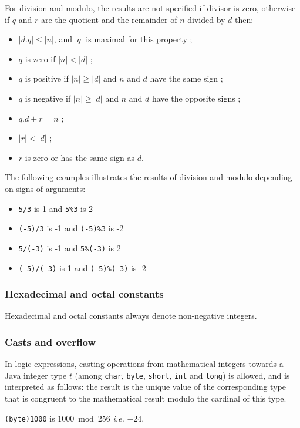 \documentclass[a4paper,11pt,twoside,openright]{report}
\begin{document}
For division and modulo, the results are not specified if divisor is
zero, otherwise if $q$ and $r$ are the quotient and the remainder of
$n$ divided by $d$ then:
\begin{itemize}
\item $|d.q| \leq |n|$, and $|q|$ is maximal for this property ;
\item $q$ is zero if $|n|<|d|$ ;
\item $q$ is positive if $|n|\geq|d|$ and $n$ and $d$ have the same sign ;
\item $q$ is negative if $|n|\geq|d|$ and $n$ and $d$ have the opposite signs ;
\item $q.d+r = n$ ;
\item $|r|<|d|$ ;
\item $r$ is zero or has the same sign as $d$.
\end{itemize}

\begin{example}
  The following examples illustrates the results of division and modulo depending on signs of arguments:
  \begin{itemize}
  \item \verb|5/3| is 1 and \verb|5%3| is 2
  \item \verb|(-5)/3| is -1 and \verb|(-5)%3| is -2
  \item \verb|5/(-3)| is -1 and \verb|5%(-3)| is 2
  \item \verb|(-5)/(-3)| is 1 and \verb|(-5)%(-3)| is -2
  \end{itemize}
\end{example}

\subsubsection{Hexadecimal and octal constants}

Hexadecimal and octal constants always denote non-negative integers. 

\subsubsection{Casts and overflow}

In logic expressions, casting operations from mathematical integers
towards a Java integer type $t$ (among \texttt{char}, \texttt{byte},
\texttt{short}, \texttt{int} and \texttt{long}) is
allowed, and is interpreted as follows: the result is the unique value
of the corresponding type that is congruent to the mathematical result
modulo the cardinal of this type.
\begin{example}
  \texttt{(byte)1000} is $1000 \bmod 256$ \emph{i.e.} $-24$.
\end{example}
\end{document}
